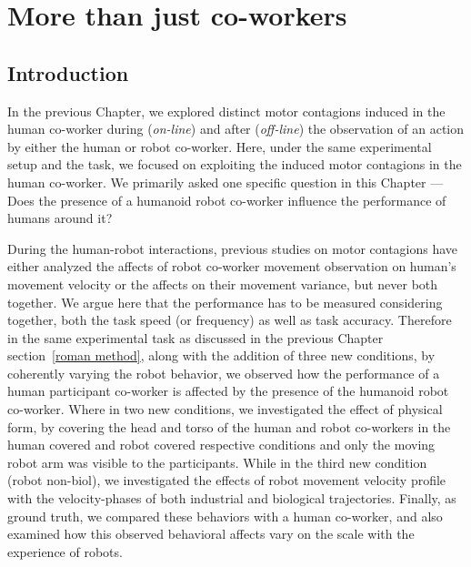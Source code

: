 
{\color{blue}\chapter{More than just co-workers}\label{more than just co-workers}}

\section{Introduction}

In the previous Chapter, we explored distinct motor contagions induced in the human co-worker during (\textit{on-line}) and after (\textit{off-line}) the observation of an action by either the human or robot co-worker. Here, under the same experimental setup and the task, we focused on exploiting the induced motor contagions in the human co-worker. We primarily asked one specific question in this Chapter ---Does the presence of a humanoid robot co-worker influence the performance of humans around it? 

During the human-robot interactions, previous studies on motor contagions have either analyzed the affects of robot co-worker movement observation on human's movement velocity or the affects on their movement variance, but never both together. We argue here that the performance has to be measured considering together, both the task speed (or frequency) as well as task accuracy. Therefore in the same experimental task as discussed in the previous Chapter section~\ref{roman method}, along with the addition of three new conditions, by coherently varying the robot behavior, we observed how the performance of a human participant co-worker is affected by the presence of the humanoid robot co-worker. Where in two new conditions, we investigated the effect of physical form, by covering the head and torso of the human and robot co-workers in the human covered and robot covered respective conditions and only the moving robot arm was visible to the participants. While in the third new condition (robot non-biol), we investigated the effects of robot movement velocity profile with the velocity-phases of both industrial and biological trajectories. Finally, as ground truth, we compared these behaviors with a human co-worker, and also examined how this observed behavioral affects vary on the scale with the experience of robots. 

